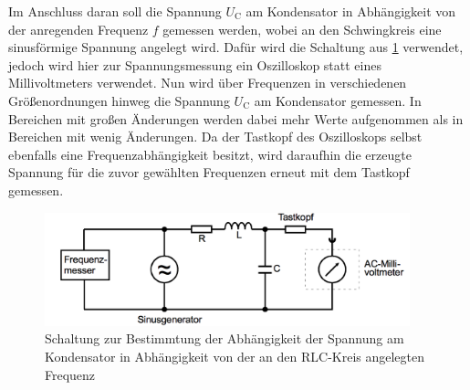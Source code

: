 Im Anschluss daran soll die Spannung $U_{\text{C}}$ am Kondensator in Abhängigkeit
von der anregenden Frequenz $f$ gemessen werden, wobei an den Schwingkreis eine
sinusförmige Spannung angelegt wird. Dafür wird die Schaltung aus \ref{fig:aufbau_3} verwendet,
jedoch wird hier zur Spannungsmessung ein Oszilloskop statt eines Millivoltmeters
verwendet. Nun wird über Frequenzen in verschiedenen Größenordnungen hinweg die
Spannung $U_{\text{C}}$  am Kondensator gemessen. In Bereichen mit großen Änderungen
 werden dabei mehr Werte aufgenommen als in Bereichen mit wenig Änderungen.
Da der Tastkopf des Oszilloskops selbst ebenfalls eine Frequenzabhängigkeit besitzt,
wird daraufhin die erzeugte Spannung für die zuvor gewählten Frequenzen erneut mit
dem Tastkopf gemessen.
\begin{figure}
  \centering
  \includegraphics[width=300pt]{data/aufbau_3.png}
  \caption{Schaltung zur Bestimmtung der Abhängigkeit der Spannung am Kondensator
  in Abhängigkeit von der an den RLC-Kreis angelegten Frequenz\cite{Versuchsanleitung1}}
  \label{fig:aufbau_3}
\end{figure}


